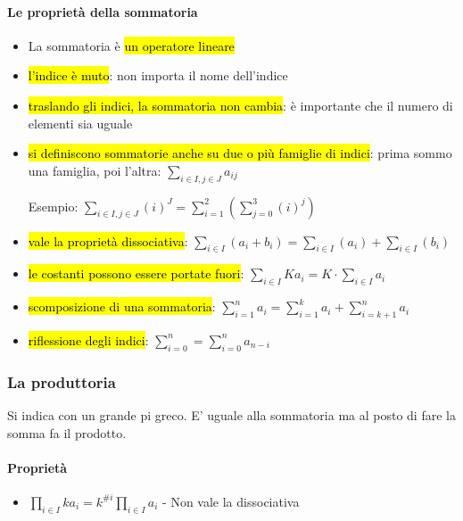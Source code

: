 \documentclass[a4paper,11pt,oneside,dvipsnames]{article}
\begin{document}
\paragraph{Le proprietà della sommatoria} 
\begin{itemize}
    \item La sommatoria è \hl{un operatore lineare}
    \item \hl{l'indice è muto}: non importa il nome dell'indice 
    \item \hl{traslando gli indici, la sommatoria non cambia}: è importante 
        che il numero di elementi sia uguale
    \item \hl{si definiscono sommatorie anche su due o più famiglie di 
        indici}: prima sommo una famiglia, poi l'altra: $\sum_{i \in I, j \in J} a_{ij}$
        
        Esempio: $\sum_{i \in I, j \in J} (i)^J = \sum_{i=1}^{2} (\sum_{j=0}^{3} (i)^j)$
    \item \hl{vale la proprietà dissociativa}:
        $\sum_{i \in I} (a_i + b_i) = \sum_{i \in I} (a_i) + \sum_{i \in I} (b_i)$
    \item \hl{le costanti possono essere portate fuori}:
        $\sum_{i \in I} Ka_i = K\cdot\sum_{i \in I} a_i$
    \item \hl{scomposizione di una sommatoria}:
        $\sum_{i=1}^n a_i = \sum_{i=1}^k a_i + \sum_{i=k+1}^n a_i$
    \item \hl{riflessione degli indici}:
        $\sum_{i=0}^n = \sum_{i=0}^n a_{n-i}$
\end{itemize}

\subsubsection{La produttoria}
Si indica con un grande pi greco. E' uguale alla sommatoria ma al posto di
fare la somma fa il prodotto.

\paragraph{Proprietà}
\begin{itemize}
    \item $\prod_{i \in I} ka_i = k^{\#i}\prod_{i \in I} a_i$
    - Non vale la dissociativa
\end{itemize}
\end{document}

